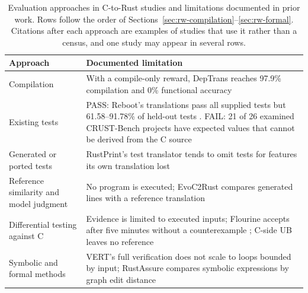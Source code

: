 \begin{table}[htbp]
\centering\footnotesize
\caption{Evaluation approaches in C-to-Rust studies and limitations
documented in prior work. Rows follow the order of
Sections~\ref{sec:rw-compilation}--\ref{sec:rw-formal}. Citations after
each approach are examples of studies that use it rather than a census,
and one study may appear in several rows.}
\label{tab:rw-evidence}
\begin{tabularx}{\textwidth}{@{}>{\raggedright\arraybackslash}p{}>{\raggedright\arraybackslash}X@{}}
\toprule
\textbf{Approach} & \textbf{Documented limitation} \\
\midrule
Compilation \cite{bedell2026llm4c2rust,feng2026deptrans,farrukh2026orbit} & With a compile-only reward, DepTrans reaches 97.9\% compilation and 0\% functional accuracy \cite{feng2026deptrans} \\
\addlinespace
Existing tests \cite{farrukh2026orbit,wang2026trail,feng2026deptrans,rustify2026,schesch2026actor} & PASS: Reboot's translations pass all supplied tests but 61.58--91.78\% of held-out tests \cite{wang2026reboot}. FAIL: 21 of 26 examined CRUST-Bench projects have expected values that cannot be derived from the C source \cite{schesch2026actor} \\
\addlinespace
Generated or ported tests \cite{schesch2026actor,leanh2026rustprint,yuan2026ptrtrans} & RustPrint's test translator tends to omit tests for features its own translation lost \cite{leanh2026rustprint} \\
\addlinespace
Reference similarity and model judgment \cite{feng2026deptrans,rustify2026,wang2026evoc2rust,leanh2026rustprint} & No program is executed; EvoC2Rust compares generated lines with a reference translation \cite{wang2026evoc2rust} \\
\addlinespace
Differential testing against C \cite{eniser2024flourine,sim2026encrust,shiraishi2026smartc2rust,actor2025} & Evidence is limited to executed inputs; Flourine accepts after five minutes without a counterexample \cite{eniser2024flourine}; C-side UB leaves no reference \\
\addlinespace
Symbolic and formal methods \cite{yang2024vert,bai2025rustassure} & VERT's full verification does not scale to loops bounded by input; RustAssure compares symbolic expressions by graph edit distance \cite{yang2024vert,bai2025rustassure} \\
\bottomrule
\end{tabularx}
\end{table}

